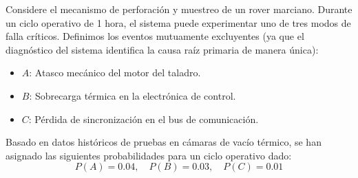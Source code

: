 Considere el mecanismo de perforación y muestreo de un rover marciano. Durante un ciclo operativo de 1 hora, el sistema puede experimentar uno de tres modos de falla críticos. Definimos los eventos mutuamente excluyentes (ya que el diagnóstico del sistema identifica la causa raíz primaria de manera única):
\begin{itemize}
    \item $A$: Atasco mecánico del motor del taladro.
    \item $B$: Sobrecarga térmica en la electrónica de control.
    \item $C$: Pérdida de sincronización en el bus de comunicación.
\end{itemize}

Basado en datos históricos de pruebas en cámaras de vacío térmico, se han asignado las siguientes probabilidades para un ciclo operativo dado:
$$ P(A) = 0.04, \quad P(B) = 0.03, \quad P(C) = 0.01 $$

